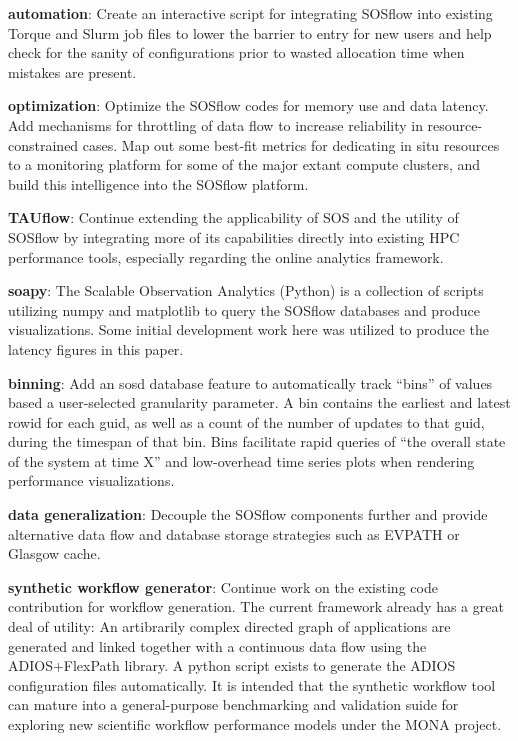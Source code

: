 \textbf{automation}: Create an interactive script for integrating
SOSflow into existing Torque and Slurm job files to lower the barrier
to entry for new users and help check for the sanity of configurations
prior to wasted allocation time when mistakes are present.

\textbf{optimization}: Optimize the SOSflow codes for memory use and
data latency. Add mechanisms for throttling of data flow to increase
reliability in resource-constrained cases. Map out some best-fit
metrics for dedicating in situ resources to a monitoring platform for
some of the major extant compute clusters, and build this intelligence
into the SOSflow platform.

\textbf{TAUflow}: Continue extending the applicability of SOS and
the utility of SOSflow by integrating more of its capabilities directly
into existing HPC performance tools, especially regarding the online
analytics framework.

\textbf{soapy}: The Scalable Observation Analytics (Python) is a 
collection of scripts utilizing numpy and matplotlib to query the
SOSflow databases and produce visualizations. Some initial development
work here was utilized to produce the latency figures in this
paper.

\textbf{binning}: Add an sosd database feature to automatically
track ``bins'' of values based a user-selected granularity
parameter. A bin contains the earliest and latest rowid for each guid,
as well as a count of the number of updates to that guid, during the
timespan of that bin. Bins facilitate rapid queries of ``the overall
state of the system at time X'' and low-overhead time series plots
when rendering performance visualizations.

\textbf{data generalization}: Decouple the SOSflow components further
and provide alternative data flow and database storage strategies such
as EVPATH or Glasgow cache.

\textbf{synthetic workflow generator}: Continue work on the existing
code contribution for workflow generation. The current framework
already has a great deal of utility: An artibrarily complex directed
graph of applications are generated and linked together with a
continuous data flow using the ADIOS+FlexPath library. A python script
exists to generate the ADIOS configuration files automatically. It is
intended that the synthetic workflow tool can mature into a
general-purpose benchmarking and validation suide for exploring new
scientific workflow performance models under the MONA project.

